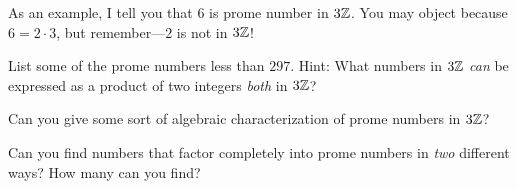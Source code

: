 As an example, I tell you that $6$ is prome number in $3\mathbb Z$. You may
object because $6 = 2\cdot 3$, but remember---$2$ is not in $3\mathbb Z$!


\begin{prob}
List some of the prome numbers less than $297$.  Hint:  What numbers in $3\mathbb Z$ \emph{can} be expressed as a product of two integers \emph{both} in $3\mathbb Z$?  
\end{prob}

\begin{prob}
Can you give some sort of algebraic characterization of prome numbers
in $3\mathbb Z$? 
\end{prob}

\begin{prob}
Can you find numbers that factor completely into prome numbers in
\textit{two} different ways? How many can you find?
\end{prob}




